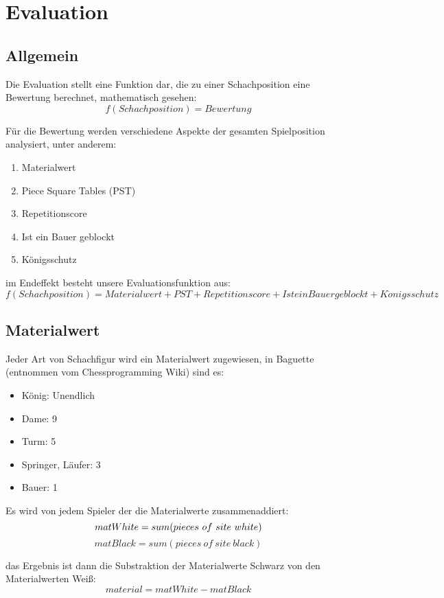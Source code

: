 \section{Evaluation}\label{eval}
\subsection{Allgemein}
Die Evaluation stellt eine Funktion dar, die zu einer Schachposition eine Bewertung berechnet, mathematisch gesehen: 
$$
f(Schachposition) = Bewertung
$$

Für die Bewertung werden verschiedene Aspekte der gesamten Spielposition analysiert, unter anderem: 
\begin{enumerate}
    \item{Materialwert}
    \item{Piece Square Tables (PST)}
    \item{Repetitionscore}
    \item{Ist ein Bauer geblockt}
    \item{K\"onigsschutz}
\end{enumerate}

im Endeffekt besteht unsere Evaluationsfunktion aus:
$$
f(Schachposition) = Materialwert + PST + Repetitionscore + Ist ein Bauer geblockt + K\ddot{o}nigsschutz
$$


\subsection{Materialwert}
Jeder Art von Schachfigur wird ein Materialwert zugewiesen, in Baguette (entnommen vom Chessprogramming Wiki) sind es:
\begin{itemize}
    \item{König: Unendlich} 
    \item{Dame: 9}
    \item{Turm: 5}
    \item{Springer, Läufer: 3}
    \item{Bauer: 1}
\end{itemize}

Es wird von jedem Spieler der die Materialwerte zusammenaddiert:
$$
matWhite = sum(pieces\ of\ site\ white) \\
$$
$$
matBlack = sum(pieces\ of\ site\ black)
$$

das Ergebnis ist dann die Substraktion der Materialwerte Schwarz von den Materialwerten Weiß: 
$$
material = matWhite - matBlack
$$

